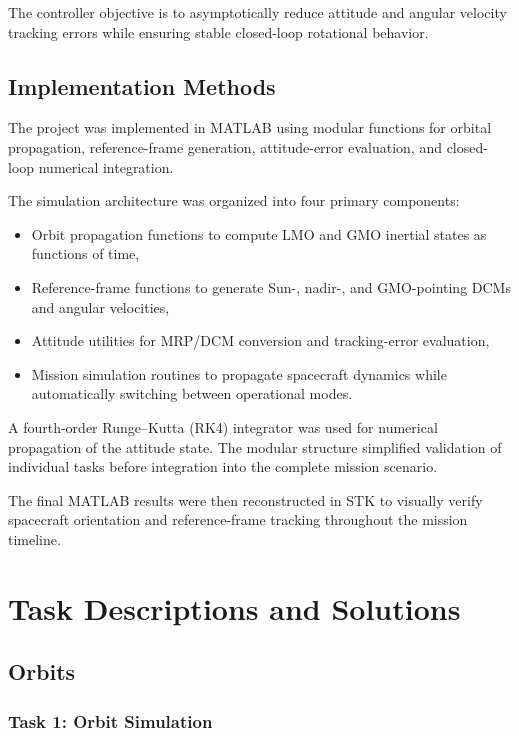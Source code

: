 \documentclass[12pt,a4paper]{report}
\begin{document}
	The controller objective is to asymptotically reduce attitude and angular velocity tracking errors while ensuring stable closed-loop rotational behavior.
	 
	\section{Implementation Methods}
	
	The project was implemented in MATLAB using modular functions for orbital propagation, reference-frame generation, attitude-error evaluation, and closed-loop numerical integration.
	
	The simulation architecture was organized into four primary components:
	
	\begin{itemize}
		\item Orbit propagation functions to compute LMO and GMO inertial states as functions of time,
		\item Reference-frame functions to generate Sun-, nadir-, and GMO-pointing DCMs and angular velocities,
		\item Attitude utilities for MRP/DCM conversion and tracking-error evaluation,
		\item Mission simulation routines to propagate spacecraft dynamics while automatically switching between operational modes.
	\end{itemize}
	
	A fourth-order Runge–Kutta (RK4) integrator was used for numerical propagation of the attitude state. The modular structure simplified validation of individual tasks before integration into the complete mission scenario.
	
	The final MATLAB results were then reconstructed in STK to visually verify spacecraft orientation and reference-frame tracking throughout the mission timeline.
	
	\chapter{Task Descriptions and Solutions}
	
	\section{Orbits}
	
	\subsection{Task 1: Orbit Simulation}
	
\end{document}
